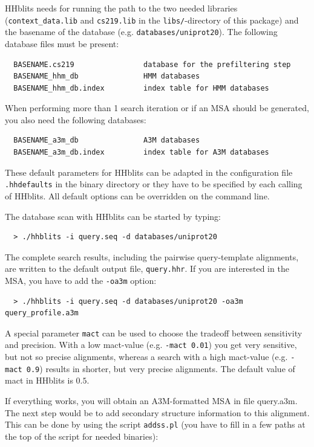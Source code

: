 \documentclass[11pt,a4paper]{article}
\begin{document}
HHblits needs for running the path to the two needed libraries
(\verb`context_data.lib` and \verb`cs219.lib` in the \verb`libs/`-directory of this package) 
and the basename of the database (e.g. \verb`databases/uniprot20`). The following database files 
must be present:

\begin{verbatim}
  BASENAME.cs219                database for the prefiltering step
  BASENAME_hhm_db               HMM databases
  BASENAME_hhm_db.index         index table for HMM databases
\end{verbatim}

When performing more than 1 search iteration or if an MSA should be generated, you also need the 
following databases:

\begin{verbatim}
  BASENAME_a3m_db               A3M databases
  BASENAME_a3m_db.index         index table for A3M databases
\end{verbatim}

These default parameters for HHblits can be adapted in the configuration file 
\verb`.hhdefaults` in the binary directory or they have to be specified by each calling of
HHblits. All default options can be overridden on the command line.

The database scan with HHblits can be started by typing:

\begin{verbatim}
  > ./hhblits -i query.seq -d databases/uniprot20
\end{verbatim}

The complete search results, including the pairwise query-template alignments, are written to 
the default output file, \verb`query.hhr`. If you are interested in the MSA, you have to add the 
\verb`-oa3m` option:

\begin{verbatim}
  > ./hhblits -i query.seq -d databases/uniprot20 -oa3m query_profile.a3m
\end{verbatim}

A special parameter \verb`mact` can be used to choose the tradeoff between sensitivity and 
precision. With a low mact-value (e.g. \verb`-mact 0.01`) you get very sensitive, but not 
so precise alignments, whereas a search with a high mact-value (e.g. \verb`-mact 0.9`) results 
in shorter, but very precise alignments. The default value of mact in HHblits is $0.5$. 

If everything works, you will obtain an A3M-formatted MSA in file query.a3m. The next step would 
be to add secondary structure information to this alignment. This can be done by using the script
\verb`addss.pl` (you have to fill in a few paths at the top of the script for needed binaries):
\end{document}

